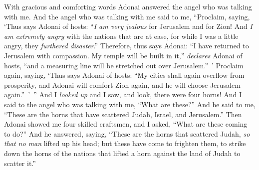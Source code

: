 \begin{biblechapter}
\verse With gracious and comforting words Adonai answered the angel who was talking with me.
\verse And the angel who was talking with me said to me, “Proclaim, saying, ‘Thus says Adonai of hosts: “\textit{I am very jealous} for Jerusalem and for Zion!
\verse And \textit{I am extremely angry} with the nations that are at ease, for while I was a little angry, they \textit{furthered disaster}.”
\verse Therefore, thus says Adonai: “I have returned to Jerusalem with compassion. My temple will be built in it,” \textit{declares} Adonai of hosts, “and a measuring line will be stretched out over Jerusalem.” ’
\verse Proclaim again, saying, ‘Thus says Adonai of hosts: “My cities shall again overflow from prosperity, and Adonai will comfort Zion again, and he will choose Jerusalem again.” ’ ”
  And I \textit{looked up} and I saw, and look, there were four horns!
\verse And I said to the angel who was talking with me, “What are these?” And he said to me, “These are the horns that have scattered Judah, Israel, and Jerusalem.”
\verse Then Adonai showed me four skilled craftsmen,
\verse and I asked, “What are these coming to do?” And he answered, saying, “These are the horns that scattered Judah, \textit{so that no man} lifted up his head; but these have come to frighten them, to strike down the horns of the nations that lifted a horn against the land of Judah to scatter it.”
\end{biblechapter}

